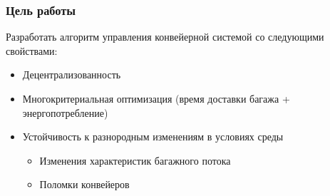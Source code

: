 \documentclass{beamer}
\begin{document}

\begin{frame}
  \frametitle{Цель работы}
  Разработать алгоритм управления конвейерной системой со следующими свойствами:
  \begin{itemize}
  \item Децентрализованность
  \item Многокритериальная оптимизация (время доставки багажа +
    энергопотребление)
  \item Устойчивость к разнородным изменениям в условиях среды
    \begin{itemize}
    \item Изменения характеристик багажного потока
    \item Поломки конвейеров
    \end{itemize}
  \end{itemize}
\end{frame}

\end{document}
